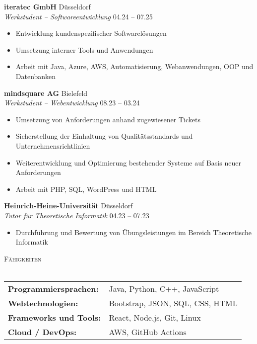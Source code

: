 \documentclass[a4paper]{article}
\newcommand{\lineunder} {
    \vspace*{-8pt} \\
    \hspace*{-18pt} \hrulefill \\
}
\newcommand{\header} [1] {
    {\hspace*{-18pt}\vspace*{6pt} \textsc{#1}}
    \vspace*{-6pt} \lineunder
}
\begin{document}
\textbf{iteratec GmbH} \hfill Düsseldorf\\
\textit{Werkstudent – Softwareentwicklung} \hfill 04.24 – 07.25\\
\vspace{-5mm}
\begin{itemize} \itemsep -1pt
    \item Entwicklung kundenspezifischer Softwarelösungen
    \item Umsetzung interner Tools und Anwendungen
    \item Arbeit mit Java, Azure, AWS, Automatisierung, Webanwendungen, OOP und Datenbanken
\end{itemize}
\vspace{3mm}
\textbf{mindsquare AG} \hfill Bielefeld\\
\textit{Werkstudent – Webentwicklung} \hfill 08.23 – 03.24\\
\vspace{-5mm}
\begin{itemize} \itemsep -1pt
    \item Umsetzung von Anforderungen anhand zugewiesener Tickets
    \item Sicherstellung der Einhaltung von Qualitätsstandards und Unternehmensrichtlinien
    \item Weiterentwicklung und Optimierung bestehender Systeme auf Basis neuer Anforderungen
    \item Arbeit mit PHP, SQL, WordPress und HTML
\end{itemize}
\vspace{3mm}
\textbf{Heinrich-Heine-Universität} \hfill Düsseldorf\\
\textit{Tutor für Theoretische Informatik} \hfill 04.23 – 07.23\\
\vspace{-5mm}
\begin{itemize} \itemsep -1pt
    \item Durchführung und Bewertung von Übungsleistungen im Bereich Theoretische Informatik
\end{itemize}
\vspace{8mm}


\header{Fähigkeiten}
\begin{tcolorbox}[myprojectbox]
\vspace{2mm}
\begin{tabular}{ l l }
    \textbf{Programmiersprachen:} & Java, Python, C++, JavaScript\\[6pt]
    \textbf{Webtechnologien:} & Bootstrap, JSON, SQL, CSS, HTML \\[6pt]
    \textbf{Frameworks und Tools:} & React, Node.js, Git, Linux \\[6pt]
    \textbf{Cloud / DevOps:} & AWS, GitHub Actions \\[6pt]
\end{tabular}
\end{tcolorbox}
\end{document}
